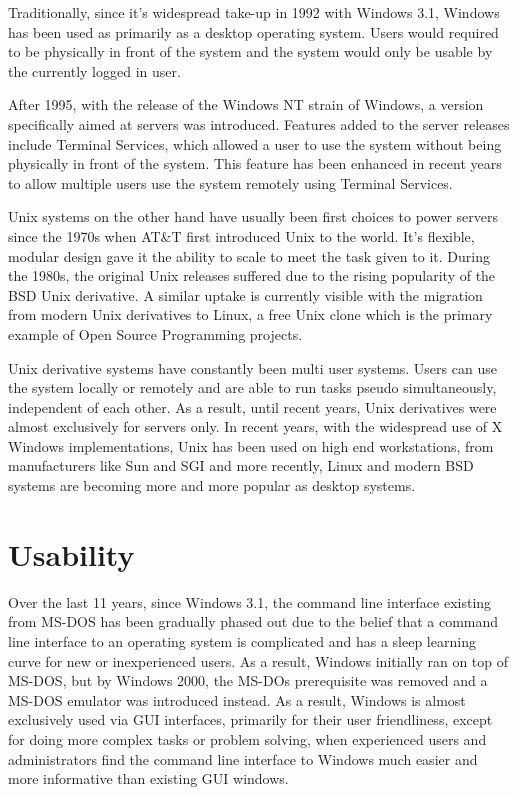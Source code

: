 \documentclass[a4paper,12pt]{article}
\begin{document}
Traditionally, since it's widespread take-up in 1992 with Windows 3.1,
Windows has been used as primarily as a desktop operating system. Users 
would required to be physically in front of the system and the system 
would only be usable by the currently logged in user.

After 1995, with the release of the Windows NT strain of Windows, a
version specifically aimed at servers was introduced. Features added to
the server releases include Terminal Services, which allowed a user
to use the system without being physically in front of the system. This
feature has been enhanced in recent years to allow multiple users use the 
system remotely using Terminal Services.

Unix systems on the other hand have usually been first choices to power
servers since the 1970s when AT\&T first introduced Unix to the world.
It's flexible, modular design gave it the ability to scale to meet the
task given to it. During the 1980s, the original Unix releases suffered
due to the rising popularity of the BSD Unix derivative. A similar
uptake is currently visible with the migration from modern Unix 
derivatives to Linux, a free Unix clone which is the primary example of
Open Source Programming projects.

Unix derivative systems have constantly been multi user systems. Users
can use the system locally or remotely and are able to run tasks pseudo
simultaneously, independent of each other. As a result, until recent
years, Unix derivatives were almost exclusively for servers only. In
recent years, with the widespread use of X Windows implementations, Unix
has been used on high end workstations, from manufacturers like Sun and
SGI and more recently, Linux and modern BSD systems are becoming more
and more popular as desktop systems.

\section*{Usability}

Over the last 11 years, since Windows 3.1, the command line interface
existing from MS-DOS has been gradually phased out due to the belief
that a command line interface to an operating system is complicated and
has a sleep learning curve for new or inexperienced users. As a result,
Windows initially ran on top of MS-DOS, but by Windows 2000, the MS-DOs
prerequisite was removed and a MS-DOS emulator was introduced instead.
As a result, Windows is almost exclusively used via GUI interfaces,
primarily for their user friendliness, except for doing more complex
tasks or problem solving, when experienced users and administrators find
the command line interface to Windows much easier and more informative
than existing GUI windows.
\end{document}
